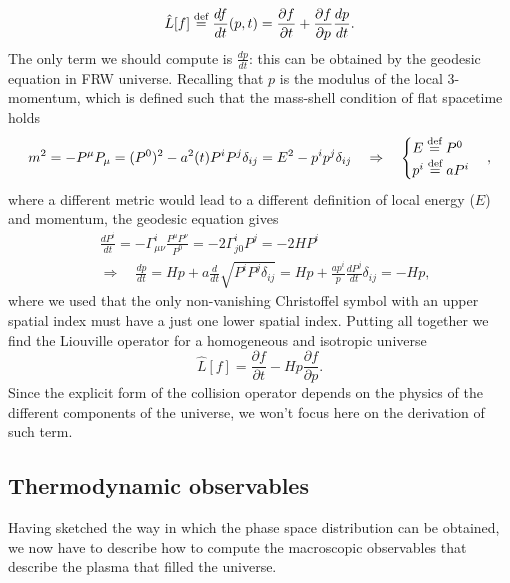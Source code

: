 $$
\hat{L}[f]\stackrel{\text{def}}{=}\frac{df}{dt}(p, t)= \frac{\partial f}{\partial t}+\frac{\partial f}{\partial p}\frac{dp}{dt}.
$$ 
The only term we should compute is $\tfrac{dp}{dt}$: this can be obtained by the geodesic equation in FRW universe. Recalling that $p$ is the modulus of the local 3-momentum, which is defined such that the mass-shell condition of flat spacetime holds
\begin{align*}
    m^2=-P^\mu P_\mu=(P^0)^2-a^2(t)P^iP^j\delta_{ij}=E^2-p^ip^j\delta_{ij}\quad\Rightarrow\quad
    \begin{cases}
        E\stackrel{\text{def}}{=} P^0\\
        p^i\stackrel{\text{def}}{=} a P^i
    \end{cases},
\end{align*}
where a different metric would lead to a different definition of local energy ($E$) and momentum, the geodesic equation gives
\begin{align*}
    &\frac{dP^i}{dt}=-\Gamma^{i}_{\mu\nu}\frac{P^\mu P^\nu}{P^0}=-2\Gamma^{i}_{j0}P^j=-2HP^i\\
    &\Rightarrow\quad \frac{dp}{dt}=H p+a\frac{d}{dt}\sqrt{P^iP^j\delta_{ij}}=Hp+\frac{ap^i}{p}\frac{dP^j}{dt}\delta_{ij}=-Hp,
\end{align*}
where we used that the only non-vanishing Christoffel symbol with an upper spatial index must have a just one lower spatial index. Putting all together we find the Liouville operator for a homogeneous and isotropic universe
\begin{equation}
    \label{eq:Homo_Iso_Liouville}
    \hat L[f]=\frac{\partial f}{\partial t}-Hp\frac{\partial f}{\partial p}.
\end{equation}
Since the explicit form of the collision operator depends on the physics of the different components of the universe, we won't focus here on the derivation of such term. 
\subsection{Thermodynamic observables}
Having sketched the way in which the phase space distribution can be obtained, we now have to describe how to compute the macroscopic observables that describe the plasma that filled the universe. 

